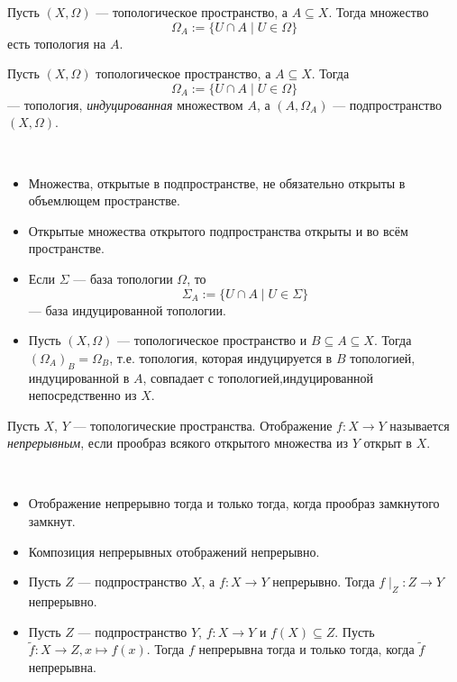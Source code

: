 \documentclass[12pt,a4paper]{article}
\begin{document}
    \begin{theorem}
        Пусть $(X, \Omega)$ --- топологическое пространство, а $A \subseteq X$. Тогда множество
        \[\Omega_A := \{U \cap A \mid U \in \Omega\}\]
        есть топология на $A$.
    \end{theorem}

    \begin{definition}
        Пусть $(X, \Omega)$ топологическое пространство, а $A \subseteq X$. Тогда
        \[\Omega_A := \{U \cap A \mid U \in \Omega\}\]
        --- топология, \emph{индуцированная} множеством $A$, а $(A, \Omega_A)$ --- подпространство $(X, \Omega)$.
    \end{definition}

    \begin{theorem}\ 
        \begin{itemize}
            \item Множества, открытые в подпространстве, не обязательно открыты в объемлющем пространстве.
            \item Открытые множества открытого подпространства открыты и во всём пространстве.
            \item Если $\Sigma$ --- база топологии $\Omega$, то
                \[\Sigma_A := \{U \cap A \mid U \in \Sigma\}\]
                --- база индуцированной топологии.
            \item Пусть $(X, \Omega)$ --- топологическое пространство и $B \subseteq A \subseteq X$. Тогда $(\Omega_A)_B = \Omega_B$, т.е. топология, которая индуцируется в $B$ топологией, индуцированной в $A$, совпадает с топологией,индуцированной непосредственно из $X$.
        \end{itemize}
    \end{theorem}

    \begin{definition}
        Пусть $X$, $Y$ --- топологические пространства. Отображение $f: X \to Y$ называется \emph{непрерывным}, если прообраз всякого открытого множества из $Y$ открыт в $X$.
    \end{definition}

    \begin{theorem}\ 
        \begin{itemize}
            \item Отображение непрерывно тогда и только тогда, когда прообраз замкнутого замкнут.
            \item Композиция непрерывных отображений непрерывно.
            \item Пусть $Z$ --- подпространство $X$, а $f: X \to Y$ непрерывно. Тогда $f{\mid}_Z: Z \to Y$ непрерывно.
            \item Пусть $Z$ --- подпространство $Y$, $f: X \to Y$ и $f(X) \subseteq Z$. Пусть $\widetilde f: X \to Z, x \mapsto f(x)$. Тогда $f$ непрерывна тогда и только тогда, когда $\widetilde f$ непрерывна.
        \end{itemize}
    \end{theorem}
\end{document}
